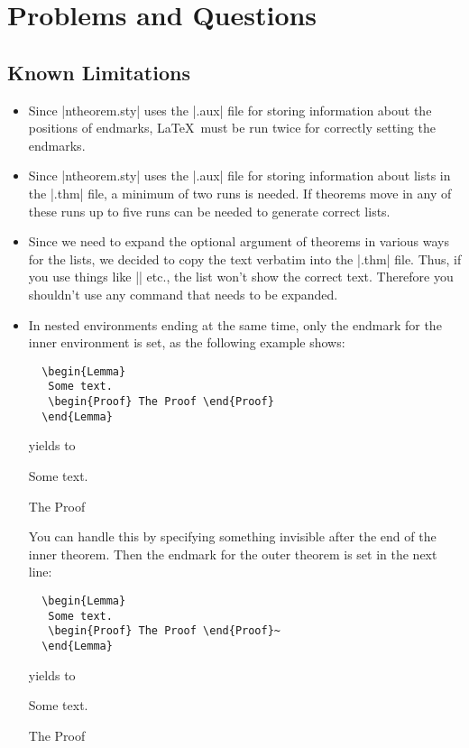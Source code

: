 \section{Problems and Questions}
\subsection{Known Limitations}

\begin{itemize}
 \item Since |ntheorem.sty| uses the |.aux| file for storing
  information about the positions of endmarks, \LaTeX\ must be
  run twice for correctly setting the endmarks.
 \item Since |ntheorem.sty| uses the |.aux| file for storing
  information about lists in the |.thm| file, a minimum of
  two runs is needed. If theorems move in any of these
  runs up to five runs can be needed to generate correct lists.
 \item Since we need to expand the optional argument of theorems
  in various ways for the lists, we decided to copy the text verbatim
  into the |.thm| file. Thus, if you use things like |\thesection|
  etc., the list won't show the correct text. Therefore you shouldn't
  use any command that needs to be expanded.
 \item In nested environments ending at the same time,
  only the endmark for the inner environment is set, as the following
  example shows:
 \begin{verbatim}
  \begin{Lemma}
   Some text.
   \begin{Proof} The Proof \end{Proof}
  \end{Lemma}\end{verbatim}
 yields to
 \begin{Lemma}
  Some text.
  \begin{Proof} The Proof \end{Proof}
 \end{Lemma}

 You can handle this by specifying something invisible after the end
 of the inner theorem. Then the endmark for the outer theorem is
 set in the next line:
 \begin{verbatim}
  \begin{Lemma}
   Some text.
   \begin{Proof} The Proof \end{Proof}~
  \end{Lemma}\end{verbatim}
 yields to
 \begin{Lemma}
  Some text.
  \begin{Proof} The Proof \end{Proof}~
 \end{Lemma}


\end{itemize}
